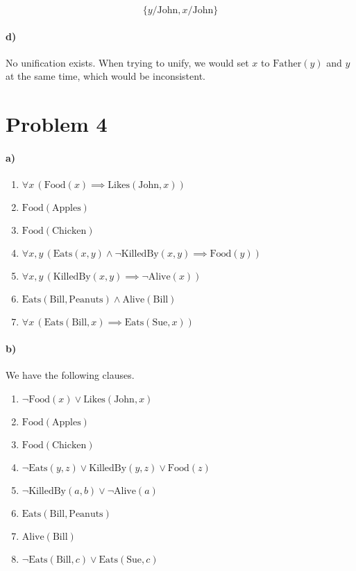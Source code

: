 \documentclass[12pt]{article}
\begin{document}
\[\{y/\text{John}, x/\text{John}\}\]

\paragraph{d)}

No unification exists. When trying to unify, we would set \(x\) to \(\text{Father}(y)\) and \(y\) at the same time, which would be inconsistent.

\section*{Problem 4}

\paragraph{a)}

\begin{enumerate}
        \item \(\forall x\,(\text{Food}(x)\implies\text{Likes}(\text{John},x))\)
        \item \(\text{Food}(\text{Apples})\)
        \item \(\text{Food}(\text{Chicken})\)
        \item \(\forall x,y\,(\text{Eats}(x,y)\land\neg \text{KilledBy}(x,y)\implies\text{Food}(y))\)
        \item \(\forall x,y\,(\text{KilledBy}(x,y)\implies \neg \text{Alive}(x))\)
        \item \(\text{Eats}(\text{Bill},\text{Peanuts})\land \text{Alive}(\text{Bill})\)
        \item \(\forall x\,(\text{Eats}(\text{Bill},x)\implies\text{Eats}(\text{Sue},x))\)
\end{enumerate}

\paragraph{b)}

We have the following clauses.
\begin{enumerate}
        \item \(\neg\text{Food}(x)\lor\text{Likes}(\text{John},x)\)
        \item \(\text{Food}(\text{Apples})\)
        \item \(\text{Food}(\text{Chicken})\)
        \item \(\neg\text{Eats}(y,z)\lor \text{KilledBy}(y,z)\lor\text{Food}(z)\)
        \item \(\neg\text{KilledBy}(a,b)\lor \neg \text{Alive}(a)\)
        \item \(\text{Eats}(\text{Bill},\text{Peanuts})\)
        \item \(\text{Alive}(\text{Bill})\)
        \item \(\neg\text{Eats}(\text{Bill},c)\lor\text{Eats}(\text{Sue},c)\)
\end{enumerate}
\end{document}
